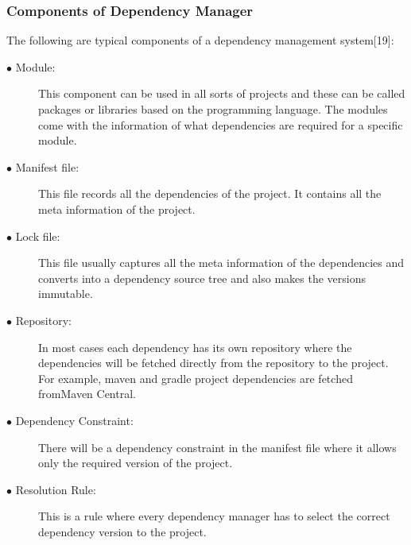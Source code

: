 \subsubsection{Components of Dependency Manager}
The following are typical components of a dependency management system[19]:
\begin{description}
	\item [$\bullet$ Module:] This component can be used in all sorts of projects and these can be called packages or libraries based on the programming language. The modules come with the information of what dependencies are required for a specific module.
	
	\item [$\bullet$ Manifest file:] This file records all the dependencies of the project. It contains all the meta information of the project. 
	
	\item [$\bullet$ Lock file:] This file usually captures all the meta information of the dependencies and converts into a dependency source tree and also makes the versions immutable.
	
	\item [$\bullet$ Repository:] In most cases each dependency has its own repository where the dependencies will be fetched directly from the repository to the project. For example, maven and gradle project dependencies are fetched fromMaven Central.
	
	\item [$\bullet$ Dependency Constraint:] There will be a dependency constraint in the manifest file where it allows only the required version of the project.
	
	\item [$\bullet$ Resolution Rule:] This is a rule where every dependency manager has to select the correct dependency version to the project.
	
\end{description}

%

